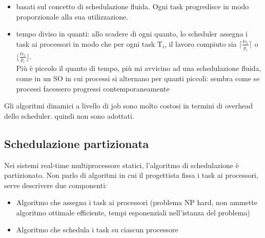 \documentclass{article}
\begin{document}
\begin{itemize}
\item basati sul concetto di schedulazione fluida. Ogni task progredisce in modo proporzionale alla sua utilizzazione.
\item tempo diviso in quanti: allo scadere di ogni quanto, lo scheduler assegna i task ai processori in modo che per ogni task T$_{i}$, il lavoro compiuto sia $\lceil \frac{te_i}{p_i}\rceil$ o $\lfloor\frac{te_i}{p_i}\rfloor$.\\ Più è piccolo il quanto di tempo, più mi avvicino ad una schedulazione fluida, come in un SO in cui processi si alternano per quanti piccoli: sembra come se processi facessero progressi contemporaneamente
\end{itemize}
Gli algoritmi dinamici a livello di job sono molto costosi in termini di overhead dello scheduler. quindi non sono adottati.
\subsection{Schedulazione partizionata}
Nei sistemi real-time multiprocessore statici, l'algoritmo di schedulazione è partizionato. Non parlo di algoritmi in cui il progettista fissa i task ai processori, serve descrivere due componenti:
\begin{itemize}
\item Algoritmo che assegna i task ai processori (problema NP hard, non ammette algoritmo ottimale efficiente, tempi esponenziali nell'istanza del problema)
\item Algoritmo che schedula i task su ciascun processore
\end{itemize}
\end{document}
